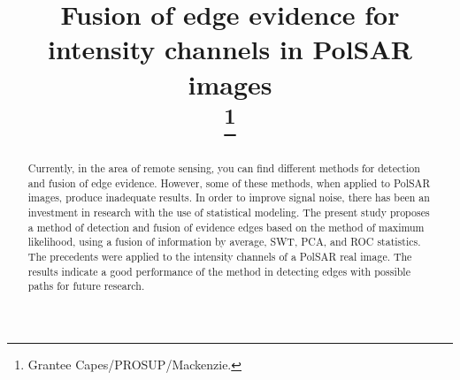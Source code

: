 \documentclass[conference]{IEEEtran}
\begin{document}
\title{Fusion of edge evidence for intensity channels in PolSAR images\\
\thanks{Grantee Capes/PROSUP/Mackenzie.}
}

\author{
\and
{}
\and
{}
}

\maketitle

\begin{abstract}
Currently, in the area of remote sensing, you can find different methods for detection and fusion of edge evidence. However, some of these methods, when applied to PolSAR images, produce inadequate results. In order to improve signal noise, there has been an investment in research with the use of statistical modeling. The present study proposes a method of detection and fusion of evidence edges based on the method of maximum likelihood, using a fusion of information by average, SWT, PCA, and ROC statistics. The precedents were applied to the intensity channels of a PolSAR real image. The results indicate a good performance of the method in detecting edges with possible paths for future research.
\end{abstract}
\end{document}
